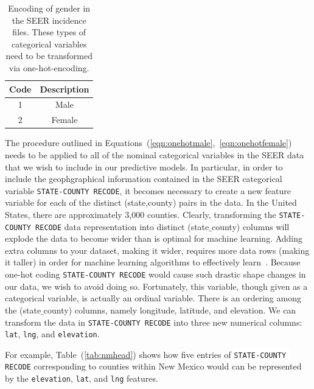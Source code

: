 \documentclass[a4paper,11pt]{article}
\newcommand{\codewhite}[1]{\colorbox{white}{\texttt{#1}}}
\begin{document}
\begin{table}[tbp]
\begin{center}
\begin{tabular}{cc}
\toprule
Code & Description \\ 
\midrule
1 & Male \\  
2 & Female \\  
\bottomrule
\end{tabular}
\caption{\label{tab:sex} Encoding of gender in the SEER incidence files. These types of categorical variables need to be transformed via one-hot-encoding.}
\end{center}
\end{table}


The procedure outlined in Equations~(\ref{eqn:onehotmale},~\ref{eqn:onehotfemale}) needs to be applied to all of the nominal categorical variables in the SEER data that we wish to include in our predictive models.
In particular, in order to include the geophgraphical information contained in the SEER categorical variable \codewhite{STATE-COUNTY RECODE}, it becomes necessary to create a new feature variable for each of the distinct (state,county) pairs in the data. In the United States, there are approximately 3,000 counties. Clearly, transforming the \codewhite{STATE-COUNTY RECODE} data representation into distinct (state$\_$county) columns will explode the data to become wider than is optimal for machine learning. Adding extra columns to your dataset, making it wider, requires more data rows (making it taller) in order for machine learning algorithms to effectively learn~\cite{bowles}. Because one-hot coding \codewhite{STATE-COUNTY RECODE} would cause such drastic shape changes in our data, we wish to avoid doing so. Fortunately, this variable, though given as a categorical variable, is actually an ordinal variable. There is an ordering among the (state$\_$county) columns, namely longitude, latitude, and elevation. We can transform the data in \codewhite{STATE-COUNTY RECODE} into three new numerical columns: \codewhite{lat}, \codewhite{lng}, and \codewhite{elevation}.

For example, Table~(\ref{tab:nmhead}) shows how five entries of \codewhite{STATE-COUNTY RECODE} corresponding to counties within New Mexico would can be represented by the 
\codewhite{elevation}, \codewhite{lat}, and \codewhite{lng} features.
\end{document}
